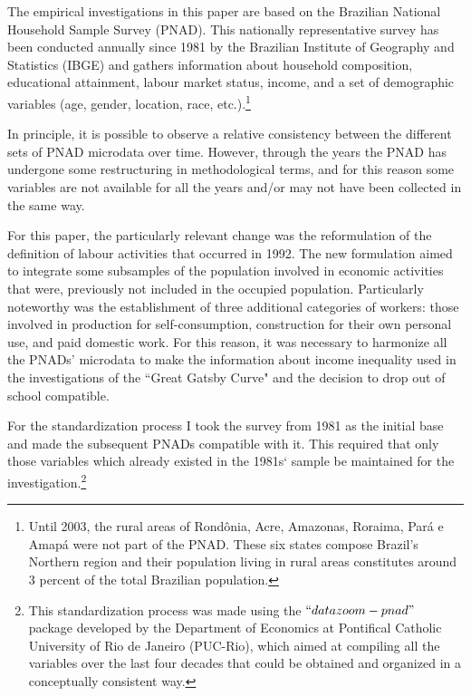 \documentclass[a4paper, 12pt]{article}
\begin{document}
The empirical investigations in this paper are based on the Brazilian National Household Sample Survey (PNAD). This nationally representative survey has been conducted annually since 1981 by the Brazilian Institute of Geography and Statistics (IBGE) and gathers information about household composition, educational attainment, labour market status, income, and a set of demographic variables (age, gender, location, race, etc.).\footnote{Until 2003, the rural areas of Rondônia, Acre, Amazonas, Roraima, Pará e Amapá were not part of the PNAD. These six states compose Brazil's Northern region and their population living in rural areas constitutes around 3 percent of the total Brazilian population.}

In principle, it is possible to observe a relative consistency between the different sets of PNAD microdata over time. However, through the years the PNAD has undergone some restructuring in methodological terms, and for this reason some variables are not available for all the years and/or may not have been collected in the same way. 

For this paper, the particularly relevant change was the reformulation of the definition of labour activities that occurred in 1992. The new formulation aimed to integrate some subsamples of the population involved in economic activities that were, previously not included in the occupied population. Particularly noteworthy was the establishment of three additional categories of workers: those involved in production for self-consumption, construction for their own personal use, and paid domestic work. For this reason, it was necessary to harmonize all the PNADs' microdata to make the information about income inequality used in the investigations of the ``Great Gatsby Curve" and the decision to drop out of school compatible.

For the standardization process I took the survey from 1981 as the initial base and made the subsequent PNADs compatible with it. This required that only those variables which already existed in the 1981s` sample be maintained for the investigation.\footnote{This standardization process was made using the $``datazoom-pnad"$ package developed by the Department of Economics at Pontifical Catholic University of Rio de Janeiro (PUC-Rio), which aimed at compiling all the variables over the last four decades that could be obtained and organized in a conceptually consistent way.}
\end{document}
